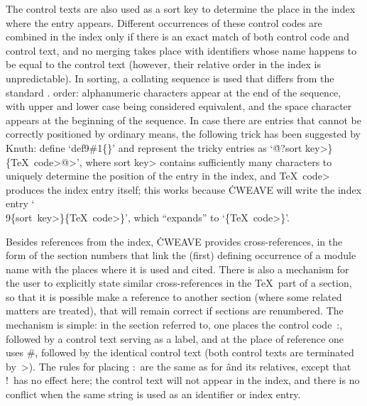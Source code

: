 The control texts are also used as a sort key to determine the place in the
index where the entry appears. Different occurrences of these control codes
are combined in the index only if there is an exact match of both control
code and control text, and no merging takes place with identifiers whose
name happens to be equal to the control text (however, their relative order
in the index is unpredictable). In sorting, a collating sequence is used
that differs from the standard \ASCII. order: alphanumeric characters appear
at the end of the sequence, with upper and lower case being considered
equivalent, and the space character appears at the beginning of the
sequence. In case there are entries that cannot be correctly positioned by
ordinary means, the following trick has been suggested by Knuth: define
`\hbox{\.{\\def\\9\#1\{\}}}' and represent the tricky entries as
`\.{@?\<sort key>\}\{\<\TeX~code>@>}', where \<sort key> contains
sufficiently many characters to uniquely determine the position of the entry
in the index, and \<\TeX\ code> produces the index entry itself; this works
because \.{CWEAVE} will write the index entry
`\.{\\9\{\<sort~key>\}\{\<\TeX~code>\}}', which ``expands'' to
`\.{\{\<\TeX~code>\}}'.

Besides references from the index, \.{CWEAVE} provides cross-references, in
the form of the section numbers that link the (first) defining occurrence of
a module name with the places where it is used and cited. There is also a
mechanism for the user to explicitly state similar cross-references in the
\TeX~part of a section, so that it is possible make a reference to another
section (where some related matters are treated), that will remain correct
if sections are renumbered. The mechanism is simple: in the section referred
to, one places the control code~\::, followed by a control text serving as a
label, and at the place of reference one uses \:\#, followed by the
identical control text (both control texts are terminated by~\:>). The rules
for placing \::\ are the same as for \:\^ and its relatives, except that
\:!\ has no effect here; the control text will not appear in the index, and
there is no conflict when the same string is used as an identifier or index
entry.

